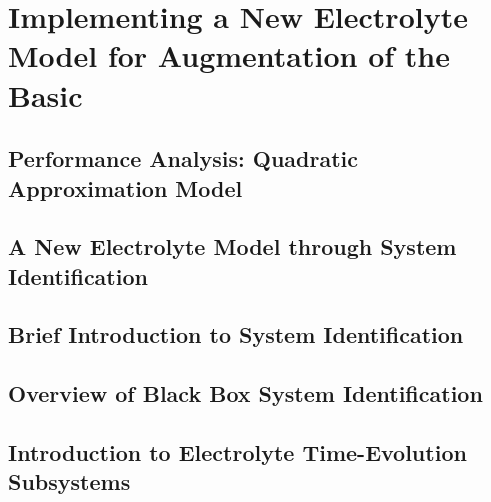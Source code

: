 
\graphicspath{{chapters/sys_id/figures/}}

\clearpage
\chapter[Electrolyte-Enhanced SPM]{Implementing a New Electrolyte Model for Augmentation of the Basic }\label{ch:newelectrolytemodel}
\ChapFrame
\vspace*{-5mm}
\startcontents[chapters]



\section{Performance Analysis: Quadratic Approximation Model}\label{sec:symbolicregression}


\section{A New Electrolyte Model through System Identification}\label{sec:newelectrolytemodel}


\section{Brief Introduction to System Identification}\label{subsec:introsysid}



\vspace*{-5mm}
\section{Overview of Black Box System Identification}\label{sec:introblackboxsysid}


\section{Introduction to Electrolyte Time-Evolution Subsystems}\label{sec:introtoplant}


